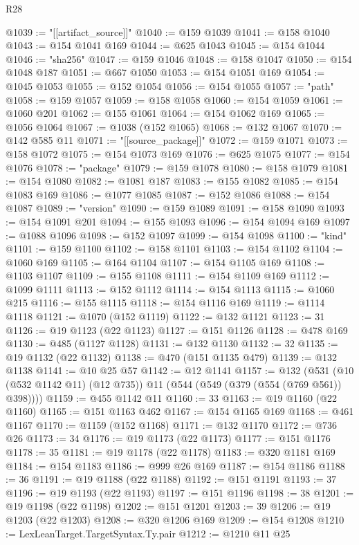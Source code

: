 \begin{lexlean}{R28}
\begin{coremodule}
@1039 := "[[artifact_source]]"
@1040 := @159 @1039
@1041 := @158 @1040
@1043 := @154 @1041 @169
@1044 := @625 @1043
@1045 := @154 @1044
@1046 := "sha256"
@1047 := @159 @1046
@1048 := @158 @1047
@1050 := @154 @1048 @187
@1051 := @667 @1050
@1053 := @154 @1051 @169
@1054 := @1045 @1053
@1055 := @152 @1054
@1056 := @154 @1055
@1057 := "path"
@1058 := @159 @1057
@1059 := @158 @1058
@1060 := @154 @1059
@1061 := @1060 @201
@1062 := @155 @1061
@1064 := @154 @1062 @169
@1065 := @1056 @1064
@1067 := @1038 (@152 @1065)
@1068 := @132 @1067
@1070 := @142 @585 @11
@1071 := "[[source_package]]"
@1072 := @159 @1071
@1073 := @158 @1072
@1075 := @154 @1073 @169
@1076 := @625 @1075
@1077 := @154 @1076
@1078 := "package"
@1079 := @159 @1078
@1080 := @158 @1079
@1081 := @154 @1080
@1082 := @1081 @187
@1083 := @155 @1082
@1085 := @154 @1083 @169
@1086 := @1077 @1085
@1087 := @152 @1086
@1088 := @154 @1087
@1089 := "version"
@1090 := @159 @1089
@1091 := @158 @1090
@1093 := @154 @1091 @201
@1094 := @155 @1093
@1096 := @154 @1094 @169
@1097 := @1088 @1096
@1098 := @152 @1097
@1099 := @154 @1098
@1100 := "kind"
@1101 := @159 @1100
@1102 := @158 @1101
@1103 := @154 @1102
@1104 := @1060 @169
@1105 := @164 @1104
@1107 := @154 @1105 @169
@1108 := @1103 @1107
@1109 := @155 @1108
@1111 := @154 @1109 @169
@1112 := @1099 @1111
@1113 := @152 @1112
@1114 := @154 @1113
@1115 := @1060 @215
@1116 := @155 @1115
@1118 := @154 @1116 @169
@1119 := @1114 @1118
@1121 := @1070 (@152 @1119)
@1122 := @132 @1121
@1123 := 31
@1126 := @19 @1123 (@22 @1123)
@1127 := @151 @1126
@1128 := @478 @169
@1130 := @485 (@1127 @1128)
@1131 := @132 @1130
@1132 := 32
@1135 := @19 @1132 (@22 @1132)
@1138 := @470 (@151 @1135 @479)
@1139 := @132 @1138
@1141 := @10 @25 @57
@1142 := @12 @1141
@1157 := @132
    (@531 (@10 (@532 @1142 @11) (@12 @735)) @11 (@544 (@549 (@379 (@554 (@769 @561)) @398))))
@1159 := @455 @1142 @11
@1160 := 33
@1163 := @19 @1160 (@22 @1160)
@1165 := @151 @1163 @462
@1167 := @154 @1165 @169
@1168 := @461 @1167
@1170 := @1159 (@152 @1168)
@1171 := @132 @1170
@1172 := @736 @26
@1173 := 34
@1176 := @19 @1173 (@22 @1173)
@1177 := @151 @1176
@1178 := 35
@1181 := @19 @1178 (@22 @1178)
@1183 := @320 @1181 @169
@1184 := @154 @1183
@1186 := @999 @26 @169
@1187 := @154 @1186
@1188 := 36
@1191 := @19 @1188 (@22 @1188)
@1192 := @151 @1191
@1193 := 37
@1196 := @19 @1193 (@22 @1193)
@1197 := @151 @1196
@1198 := 38
@1201 := @19 @1198 (@22 @1198)
@1202 := @151 @1201
@1203 := 39
@1206 := @19 @1203 (@22 @1203)
@1208 := @320 @1206 @169
@1209 := @154 @1208
@1210 := LexLeanTarget.TargetSyntax.Ty.pair
@1212 := @1210 @11 @25

\end{coremodule}
\end{lexlean}
